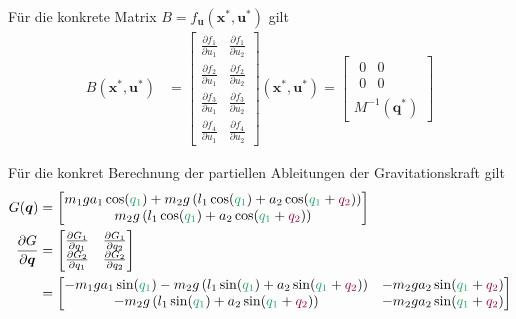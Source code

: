 \documentclass[a4paper, 12pt]{scrartcl}
\newcommand{\gruen}[2][cadGreen]{\textcolor{#1}{#2}}
\newcommand{\dunkelrot}[2][dunkelrot]{\textcolor{#1}{#2}}
\begin{document}
Für die konkrete Matrix $B = f_{\bm{u}}(\bm{x}^*, \bm{u}^*)$ gilt
\begin{align*}
    B(\bm{x}^*, \bm{u}^*)
    &=
    \begin{bmatrix}
        \frac{\partial f_1}{\partial u_1}  
        & \frac{\partial f_1}{\partial u_2}  
        \\ \frac{\partial f_2}{\partial u_1} 
        & \frac{\partial f_2}{\partial u_2} 
        \\ \frac{\partial f_3}{\partial u_1} 
        & \frac{\partial f_3}{\partial u_2} 
        \\ \frac{\partial f_4}{\partial u_1} 
        & \frac{\partial f_4}{\partial u_2} 
    \end{bmatrix}(\bm{x}^*, \bm{u}^*) 
    =  
    \begin{bmatrix}
        \begin{matrix}
            0 & 0 \\
            0 & 0
        \end{matrix}
        \\[12pt]
        M^{-1}(\bm{q}^*)
    \end{bmatrix}   
\end{align*}

Für die konkret Berechnung der partiellen Ableitungen der Gravitationskraft gilt
\begin{align*}
    G(\bm{q}) &=
    \begin{bmatrix}
        m_1  g  a_1 \cos(\gruen{q_1}) + m_2  g \left( l_1 \cos(\gruen{q_1}) 
        + a_2 \cos(\gruen{q_1} + \dunkelrot{q_2}) \right) \\
        m_2  g \left( l_1 \cos(\gruen{q_1}) + a_2 \cos(\gruen{q_1} + \dunkelrot{q_2}) \right)
    \end{bmatrix}
    \\
    \frac{\partial G}{\partial \bm{q}}
    &=
    \begin{bmatrix}
        \frac{\partial G_1}{\partial q_1}
        & \frac{\partial G_1}{\partial q_2} \\
        \frac{\partial G_2}{\partial q_1}
        & \frac{\partial G_2}{\partial q_2}
    \end{bmatrix} \\
    &=
    \begin{bmatrix}
        - m_1 g a_1 \sin(\gruen{q_1}) 
        - m_2 g \left( l_1 \sin(\gruen{q_1}) + a_2 \sin(\gruen{q_1} + \dunkelrot{q_2}) \right)
        & - m_2 g a_2 \sin(\gruen{q_1} + \dunkelrot{q_2}) \\
        - m_2 g \left( l_1 \sin(\gruen{q_1}) + a_2 \sin(\gruen{q_1} + \dunkelrot{q_2}) \right)
        & - m_2 g a_2 \sin(\gruen{q_1} + \dunkelrot{q_2})
    \end{bmatrix}
\end{align*}
\end{document}
